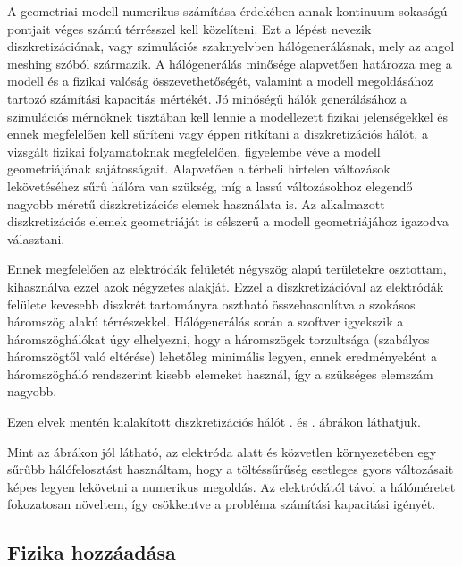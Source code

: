 A geometriai modell numerikus számítása érdekében annak kontinuum sokaságú pontjait véges számú térrésszel kell közelíteni. Ezt a lépést nevezik diszkretizációnak, vagy szimulációs szaknyelvben hálógenerálásnak, mely az angol meshing szóból származik. A hálógenerálás minősége alapvetően határozza meg a modell és a fizikai valóság összevethetőségét, valamint a modell megoldásához tartozó számítási kapacitás mértékét. Jó minőségű hálók generálásához a szimulációs mérnöknek tisztában kell lennie a modellezett fizikai jelenségekkel és ennek megfelelően kell sűríteni vagy éppen ritkítani a diszkretizációs hálót, a vizsgált fizikai folyamatoknak megfelelően, figyelembe véve a modell geometriájának sajátosságait. Alapvetően a térbeli hirtelen változások lekövetéséhez sűrű hálóra van szükség, míg a lassú változásokhoz elegendő nagyobb méretű diszkretizációs elemek használata is. Az alkalmazott diszkretizációs elemek geometriáját is célszerű a modell geometriájához igazodva választani.

Ennek megfelelően az elektródák felületét négyszög alapú  területekre osztottam, kihasználva ezzel azok négyzetes alakját. Ezzel a diszkretizációval az elektródák felülete kevesebb diszkrét tartományra osztható összehasonlítva a szokásos háromszög alakú térrészekkel. Hálógenerálás során a szoftver igyekszik a háromszöghálókat úgy elhelyezni, hogy a háromszögek torzultsága (szabályos háromszögtől való eltérése) lehetőleg minimális legyen, ennek eredményeként a háromszögháló rendszerint kisebb elemeket használ, így a szükséges elemszám nagyobb.

Ezen elvek mentén kialakított diszkretizációs hálót . és  . ábrákon láthatjuk.


Mint az ábrákon jól látható, az elektróda alatt és közvetlen környezetében egy sűrűbb hálófelosztást használtam, hogy a töltéssűrűség esetleges gyors változásait képes legyen lekövetni a numerikus megoldás. Az elektródától távol a hálóméretet fokozatosan növeltem, így csökkentve a probléma számítási kapacitási igényét.

\subsection{Fizika hozzáadása}

